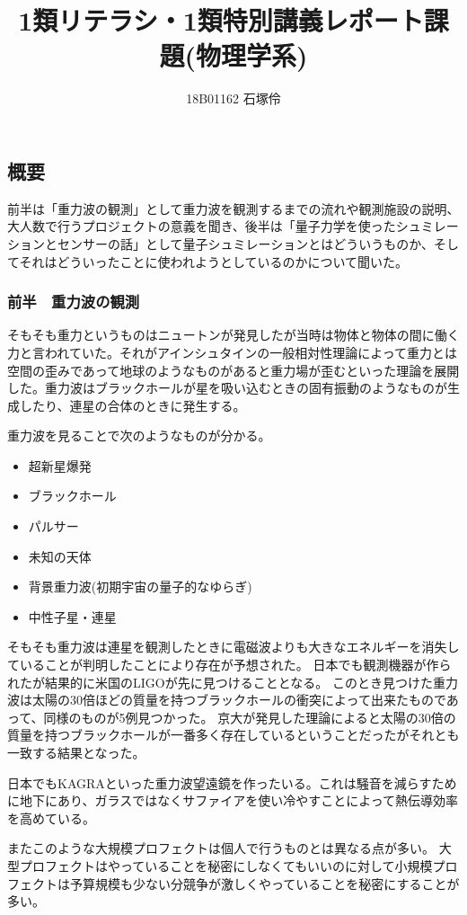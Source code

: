 \documentclass[dvipdfmx]{jsarticle}
\title{1類リテラシ・1類特別講義レポート課題(物理学系)}
\author{18B01162 石塚伶}
\date{}
\begin{document}
\maketitle
\subsection{概要}
前半は「重力波の観測」として重力波を観測するまでの流れや観測施設の説明、大人数で行うプロジェクトの意義を聞き、後半は「量子力学を使ったシュミレーションとセンサーの話」として量子シュミレーションとはどういうものか、そしてそれはどういったことに使われようとしているのかについて聞いた。

\subsubsection{前半　\textbf{重力波の観測}}

そもそも重力というものはニュートンが発見したが当時は物体と物体の間に働く力と言われていた。それがアインシュタインの一般相対性理論によって重力とは空間の歪みであって地球のようなものがあると重力場が歪むといった理論を展開した。重力波はブラックホールが星を吸い込むときの固有振動のようなものが生成したり、連星の合体のときに発生する。

重力波を見ることで次のようなものが分かる。
\begin{itemize}
  \item 超新星爆発
  \item ブラックホール
  \item パルサー
  \item 未知の天体
  \item 背景重力波(初期宇宙の量子的なゆらぎ)
  \item 中性子星・連星
\end{itemize}
そもそも重力波は連星を観測したときに電磁波よりも大きなエネルギーを消失していることが判明したことにより存在が予想された。
日本でも観測機器が作られたが結果的に米国のLIGOが先に見つけることとなる。
このとき見つけた重力波は太陽の30倍ほどの質量を持つブラックホールの衝突によって出来たものであって、同様のものが5例見つかった。
京大が発見した理論によると太陽の30倍の質量を持つブラックホールが一番多く存在しているということだったがそれとも一致する結果となった。

日本でもKAGRAといった重力波望遠鏡を作ったいる。これは騒音を減らすために地下にあり、ガラスではなくサファイアを使い冷やすことによって熱伝導効率を高めている。

またこのような大規模プロフェクトは個人で行うものとは異なる点が多い。
大型プロフェクトはやっていることを秘密にしなくてもいいのに対して小規模プロフェクトは予算規模も少ない分競争が激しくやっていることを秘密にすることが多い。
\end{document}
